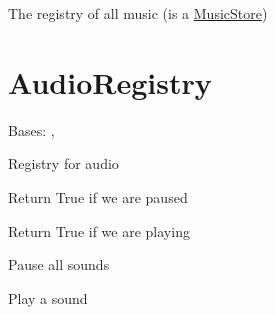 \documentclass[letterpaper,10pt,english]{sphinxmanual}
\begin{document}
\begin{fulllineitems}
\label{sound:sound.serge.sound.Music}
The registry of all music (is a {\hyperref[sound:musicstore]{MusicStore}})

\end{fulllineitems}



\section{AudioRegistry}
\label{sound:audioregistry}

\begin{fulllineitems}
\label{sound:serge.sound.AudioRegistry}
Bases: {\hyperref[common:serge.registry.GeneralStore]{}}, {\hyperref[common:serge.common.EventAware]{}}

Registry for audio

\begin{fulllineitems}
\label{sound:serge.sound.AudioRegistry.isPaused}
Return True if we are paused

\end{fulllineitems}


\begin{fulllineitems}
\label{sound:serge.sound.AudioRegistry.isPlaying}
Return True if we are playing

\end{fulllineitems}


\begin{fulllineitems}
\label{sound:serge.sound.AudioRegistry.pause}
Pause all sounds

\end{fulllineitems}


\begin{fulllineitems}
\label{sound:serge.sound.AudioRegistry.play}
Play a sound


\end{fulllineitems}
\end{fulllineitems}
\end{document}
